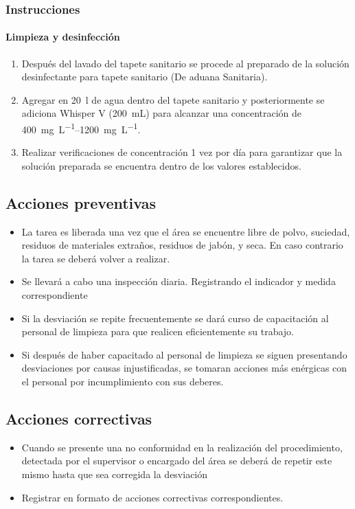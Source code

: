 \subsubsection{Instrucciones}

\paragraph{Limpieza y desinfección}

\begin{enumerate}
	\item Después del lavado del tapete sanitario se procede al preparado de la solución desinfectante para tapete sanitario (De aduana Sanitaria).
	\item Agregar en \qty{20}{\litre} de agua dentro del tapete sanitario y posteriormente se adiciona Whisper V (\qty{200}{\milli\liter}) para alcanzar una concentración de \qtyrange{400}{1200}{\milli\gram\per\liter}.
	\item Realizar verificaciones de concentración 1 vez por día para garantizar que la solución preparada se encuentra dentro de los valores establecidos.
\end{enumerate}

\subsection{Acciones preventivas}

\begin{itemize}
	\item La tarea es liberada una vez que el área se encuentre libre de polvo, suciedad, residuos de materiales extraños, residuos de jabón, y seca. En caso contrario la tarea se deberá volver a realizar.
	\item Se llevará a cabo una inspección diaria. Registrando el indicador y medida correspondiente
	\item Si la desviación se repite frecuentemente se dará curso de capacitación al personal de limpieza para que realicen eficientemente su trabajo.
	\item Si después de haber capacitado al personal de limpieza se siguen presentando desviaciones por causas injustificadas, se tomaran acciones más enérgicas con el personal por incumplimiento con sus deberes.
\end{itemize}

\subsection{Acciones correctivas}
\begin{itemize}
	\item Cuando se presente una no conformidad en la realización del procedimiento, detectada por el supervisor o encargado del área se deberá de repetir este mismo hasta que sea corregida la desviación
	\item Registrar en formato de acciones correctivas correspondientes.
\end{itemize}

